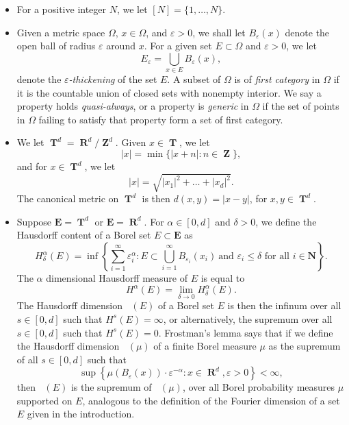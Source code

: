 \documentclass[12pt,reqno]{article}
\numberwithin{equation}{section}
\DeclareMathOperator{\hausdim}{\dim_{\mathbf{H}}}
\DeclareMathOperator{\RR}{\mathbf{R}}
\DeclareMathOperator{\ZZ}{\mathbf{Z}}
\DeclareMathOperator{\TT}{\mathbf{T}}
\begin{document}
\begin{itemize}
    \item For a positive integer $N$, we let $[N] = \{ 1, \dots, N \}$.

    \item Given a metric space $\Omega$, $x \in \Omega$, and $\varepsilon > 0$, we shall let $B_\varepsilon(x)$ denote the open ball of radius $\varepsilon$ around $x$. For a given set $E \subset \Omega$ and $\varepsilon > 0$, we let
    \[ E_\varepsilon = \bigcup_{x \in E} B_\varepsilon(x), \]
    denote the \emph{$\varepsilon$-thickening} of the set $E$. A subset of $\Omega$ is of \emph{first category} in $\Omega$ if it is the countable union of closed sets with nonempty interior. We say a property holds \emph{quasi-always}, or a property is \emph{generic} in $\Omega$ if the set of points in $\Omega$ failing to satisfy that property form a set of first category.

    \item We let $\TT^d = \RR^d/\ZZ^d$. Given $x \in \TT$, we let
    \[ |x| = \min \{ |x + n| : n \in \ZZ \}, \]
    and for $x \in \TT^d$, we let
    \[ |x| = \sqrt{|x_1|^2 + \dots + |x_d|^2}. \]
    The canonical metric on $\TT^d$ is then $d(x,y) = |x - y|$, for $x,y \in \TT^d$.

    \item Suppose $\mathbf{E} = \TT^d$ or $\mathbf{E} = \RR^d$. For $\alpha \in [0,d]$ and $\delta > 0$, we define the Hausdorff content of a Borel set $E \subset \mathbf{E}$ as
    \[ H^\alpha_\delta(E) = \inf \left\{ \sum_{i = 1}^\infty \varepsilon_i^\alpha : E \subset \bigcup_{i = 1}^\infty B_{\varepsilon_i}(x_i)\ \text{and $\varepsilon_i \leq \delta$ for all $i \in \mathbf{N}$} \right\}. \]
    The $\alpha$ dimensional Hausdorff measure of $E$ is equal to
    \[ H^\alpha(E) = \lim_{\delta \to 0} H^\alpha_\delta(E). \]
    The Hausdorff dimension $\hausdim(E)$ of a Borel set $E$ is then the infinum over all $s \in [0,d]$ such that $H^s(E) = \infty$, or alternatively, the supremum over all $s \in [0,d]$ such that $H^s(E) = 0$. Frostman's lemma says that if we define the Hausdorff dimension $\hausdim(\mu)$ of a finite Borel measure $\mu$ as the supremum of all $s \in [0,d]$ such that
    \begin{equation} \label{hausdim}
        \sup \left\{ \mu(B_\varepsilon(x)) \cdot \varepsilon^{-\alpha} : x \in \RR^d, \varepsilon > 0 \right\} < \infty,
    \end{equation}
    then $\hausdim(E)$ is the supremum of $\hausdim(\mu)$, over all Borel probability measures $\mu$ supported on $E$, analogous to the definition of the Fourier dimension of a set $E$ given in the introduction.


\end{itemize}
\end{document}
